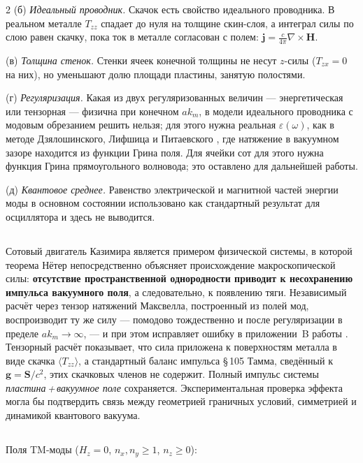 \documentclass[twoside, 10pt]{article}
\def\myvspacebeforesubsection{-2.0mm}
\def\myvspaceaftersubsection{-2.5mm}
\begin{document}
\begin{multicols}{2}
(б) \textit{Идеальный проводник.} Скачок есть свойство идеального проводника. В реальном металле
\(T_{zz}\) спадает до нуля на толщине скин-слоя, а интеграл силы по слою равен скачку, пока ток в
металле согласован с полем: \(\mathbf j=\frac c{4\pi}\nabla\times\mathbf H\).

(в) \textit{Толщина стенок.} Стенки ячеек конечной толщины не несут \(z\)-силы (\(T_{zx}=0\) на
них), но уменьшают долю площади пластины, занятую полостями.

(г) \textit{Регуляризация.} Какая из двух регуляризованных величин --- энергетическая или
тензорная --- физична при конечном \(ak_m\), в модели идеального проводника с модовым обрезанием
решить нельзя; для этого нужна реальная \(\varepsilon(\omega)\), как в методе Дзялошинского,
Лифшица и Питаевского \cite{DLP1961}, где натяжение в вакуумном зазоре находится из функции
Грина поля. Для ячейки сот для этого нужна функция Грина прямоугольного волновода; это оставлено
для дальнейшей работы.

(д) \textit{Квантовое среднее.} Равенство электрической и магнитной частей энергии моды в
основном состоянии использовано как стандартный результат для осциллятора и здесь не выводится.

\vspace{\myvspacebeforesubsection}
\subsection*{}
\vspace{\myvspaceaftersubsection}


Сотовый двигатель Казимира является примером физической системы, в которой теорема Нётер
непосредственно объясняет происхождение макроскопической силы: \textbf{отсутствие
пространственной однородности приводит к несохранению импульса вакуумного поля}, а следовательно, к
появлению тяги. Независимый расчёт через тензор натяжений Максвелла, построенный из полей мод,
воспроизводит ту же силу --- помодово тождественно и после регуляризации в пределе
\(ak_m\to\infty\), --- и при этом исправляет ошибку в приложении~B работы \cite{Drozdov2024}.
Тензорный расчёт показывает, что сила приложена к поверхностям металла в виде скачка
\(\langle T_{zz}\rangle\), а стандартный баланс импульса \S\,105 Тамма, сведённый к
\(\mathbf g=\mathbf S/c^2\), этих скачковых членов не содержит. Полный импульс системы
\emph{пластина\,+\,вакуумное поле} сохраняется. Экспериментальная проверка эффекта могла бы
подтвердить связь между геометрией граничных условий, симметрией и динамикой квантового вакуума.

\vspace{\myvspacebeforesubsection}
\subsection*{}
\vspace{\myvspaceaftersubsection}


Поля TM-моды (\(H_z=0\), \(n_x,n_y\ge1\), \(n_z\ge0\)):
\end{multicols}
\end{document}
